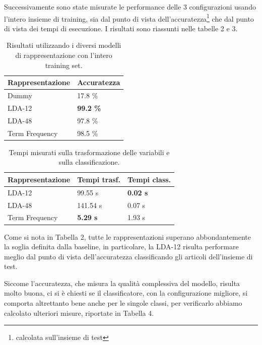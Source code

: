 \documentclass[runningheads]{llncs}
\begin{document}
Successivamente sono state misurate le performance delle 3 configurazioni usando l'intero insieme di training, sia dal punto di vista dell'accuratezza\footnote{calcolata sull'insieme di test} che dal punto di vista dei tempi di esecuzione. I risultati sono riassunti nelle tabelle 2 e 3.

\begin{table}[]
    \centering
\begin{tabular}{ll}
\hline
Rappresentazione & Accuratezza      \\ \hline
Dummy            & 17.8 \%          \\
LDA-12           & \textbf{99.2 \%} \\
LDA-48           & 97.8 \%          \\
Term Frequency   & 98.5 \% \\ \hline
\end{tabular}
    \caption{Risultati utilizzando i diversi modelli di rappresentazione con l'intero training set.}%
\end{table}

\begin{table}[]
    \centering
\begin{tabular}{lll}
\hline
Rappresentazione & Tempi trasf. & Tempi class. \\ \hline
LDA-12           & 99.55 s & \textbf{0.02 s} \\
LDA-48           & 141.54 s & 0.07 s   \\
Term Frequency   & \textbf{5.29 s} & 1.93 s \\ \hline
\end{tabular}
    \caption{Tempi misurati sulla trasformazione delle variabili e sulla classificazione.}%
\end{table}


Come si nota in Tabella 2, tutte le rappresentazioni superano abbondantemente la soglia definita dalla baseline, in particolare, la LDA-12 risulta performare meglio dal punto di vista dell'accuratezza classificando gli articoli dell'insieme di test.

\vskip 1.2in

Siccome l'accuratezza, che misura la qualit\`a complessiva del modello, risulta molto buona, ci si \`e chiesti se il classificatore, con la configurazione migliore, si comporta altrettanto bene anche per le singole classi, per verificarlo abbiamo calcolato ulteriori misure, riportate in Tabella 4.
\end{document}
